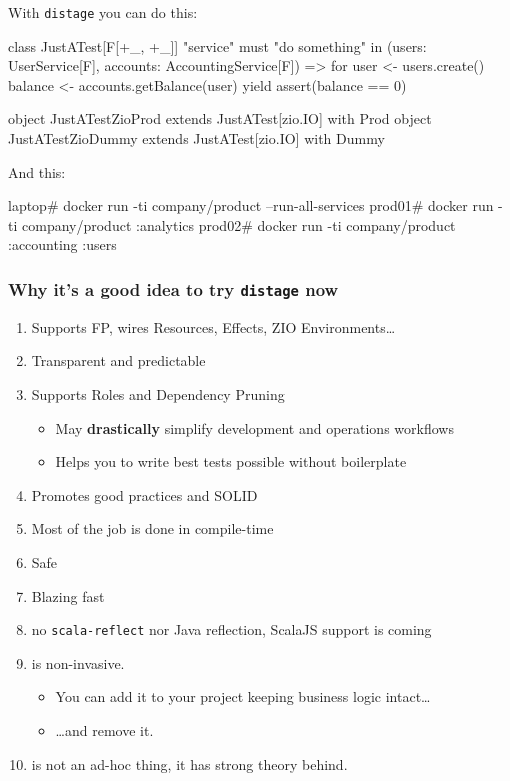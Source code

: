 \documentclass[usenames,dvipsnames,aspectratio=169]{beamer}
\newcommand{\distage}{\texttt{distage}\xspace}
\begin{document}
\begin{frame}[fragile]
With \distage you can do this:

\begin{scalacode}
class JustATest[F[+_, +_]] {
  "service" must {
    "do something" in {
      (users: UserService[F], accounts: AccountingService[F]) =>
      for {
        user  <- users.create()
        balance <- accounts.getBalance(user)
      } yield {
        assert(balance == 0)
      }
    }
  }
}

object JustATestZioProd extends JustATest[zio.IO] with Prod
object JustATestZioDummy extends JustATest[zio.IO] with Dummy
\end{scalacode}
\end{frame}

\begin{frame}[fragile]
And this:

\begin{textcode}
laptop# docker run -ti company/product --run-all-services
prod01# docker run -ti company/product :analytics
prod02# docker run -ti company/product :accounting :users
\end{textcode}
\end{frame}

\begin{frame}
  \frametitle{Why it's a good idea to try \distage now}
  \begin{enumerate}
    \item Supports FP, wires Resources, Effects, ZIO Environments\dots
    \item Transparent and predictable
    \item Supports Roles and Dependency Pruning
      \begin{itemize}
        \item May \textbf{drastically} simplify development and operations workflows
        \item Helps you to write best tests possible without boilerplate
      \end{itemize}
    \item Promotes good practices and SOLID
    \item Most of the job is done in compile-time
    \item Safe
    \item Blazing fast
    \item no \texttt{scala-reflect} nor Java reflection, ScalaJS support is coming
    \item is non-invasive.
      \begin{itemize}
        \item You can add it to your project keeping business logic intact\dots
        \item \dots and remove it.
      \end{itemize}
    \item is not an ad-hoc thing, it has strong theory behind.
  \end{enumerate}
\end{frame}
\end{document}
